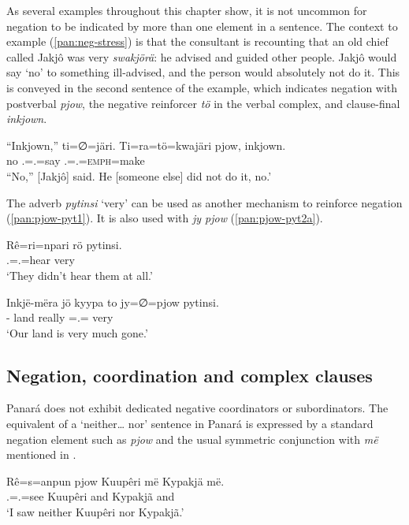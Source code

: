 \documentclass[output=paper,colorlinks,citecolor=brown,draft]{langscibook}
\begin{document}
As several examples throughout this chapter show, it is not uncommon for negation to be indicated by more than one element in a sentence. The context to example (\ref{pan:neg-stress}) is that the consultant is recounting that an old chief called Jakjô was very \textit{swakjörä}: he advised and guided other people. Jakjô would say `no' to something ill-advised, and the person would absolutely not do it. This is conveyed in the second sentence of the example, which indicates negation with postverbal \textit{pjow}, the negative reinforcer \textit{tö} in the verbal complex, and clause-final \textit{inkjown}. 

\ea\label{pan:neg-stress} 
    \gll ``Inkjown,'' ti=∅=järi. Ti=ra=tö=kwajäri pjow, inkjown. \\ 
    {\db}no \Tsg.\Erg{}=\Tpl.\Abs{}=say \Tsg.\Erg{}=\Tpl.\Abs{}=\textsc{emph}=make \Neg{} \Neg{}  \\
    ``No,'' [Jakjô] said. He [someone else] did not do it, no.' \\
\z


The adverb \textit{pytinsi} `very' can be used as another mechanism to reinforce negation (\ref{pan:pjow-pyt1}). It is also used with \textit{jy pjow} (\ref{pan:pjow-pyt2a}).

\ea\label{pan:pjow-pyt1}
    \gll Rê=ri=npari rö pytinsi. \\
    \Tpl.\Erg{}=\Tpl.\Abs{}=hear \Neg{} very \\
    \glt `They didn't hear them at all.' \\
\z

\ea\label{pan:pjow-pyt2a}
    \gll Inkjë-mëra jö kyypa to jy=∅=pjow pytinsi. \\
    \Fsg-\Pl{} \Poss{} land really \Intr{}=\Tsg.\Abs{}=\Neg{} very  \\
    \glt `Our land is very much gone.' \\
\z

\subsection{Negation, coordination and complex clauses}\label{pan:sec:coord}

Panará does not exhibit dedicated negative coordinators or subordinators. The equivalent of a `neither\dots{} nor' sentence in Panará is expressed by a standard negation element such as \textit{pjow} and the usual symmetric conjunction with \textit{më} mentioned in .


\ea\label{pan:pjow-pyt2b}
    \gll Rê=s=anpun pjow Kuupêri më Kypakjä më. \\
     \Fsg.\Erg{}=\Tsg.\Abs{}=see \Neg{} Kuupêri and Kypakjã and \\ 
    \glt `I saw neither Kuupêri nor Kypakjã.' \\
\z
\end{document}
